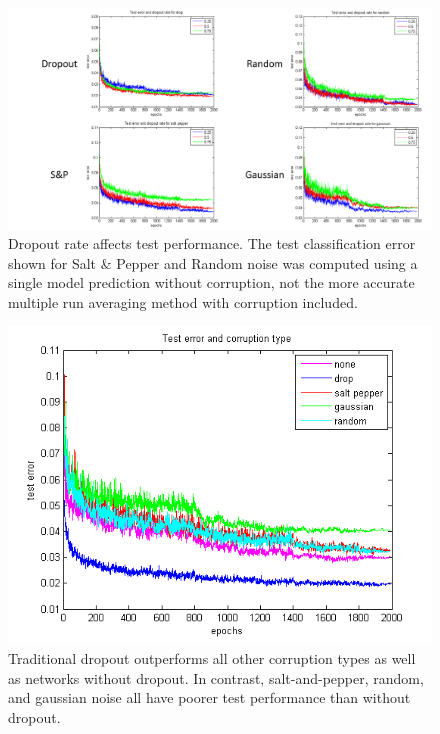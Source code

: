 \documentclass{article} %
\begin{document}
\begin{figure}
\begin{center}
\includegraphics[width=\textwidth]{dropoutRateAndTestError.png}
\caption{Dropout rate affects test performance. The test classification error shown for Salt \& Pepper and Random noise was computed using a single model prediction without corruption, not the more accurate multiple run averaging method with corruption included.}
\label{fig:rate,error}
\end{center}
\end{figure}

\begin{figure}
\begin{center}
\includegraphics[width=\textwidth]{testErrorCorruptionType.png}
\caption{Traditional dropout outperforms all other corruption types as well as networks without dropout. In contrast, salt-and-pepper, random, and gaussian noise all have poorer test performance than without dropout.}
\label{fig:corruption,error}
\end{center}
\end{figure}
\end{document}
